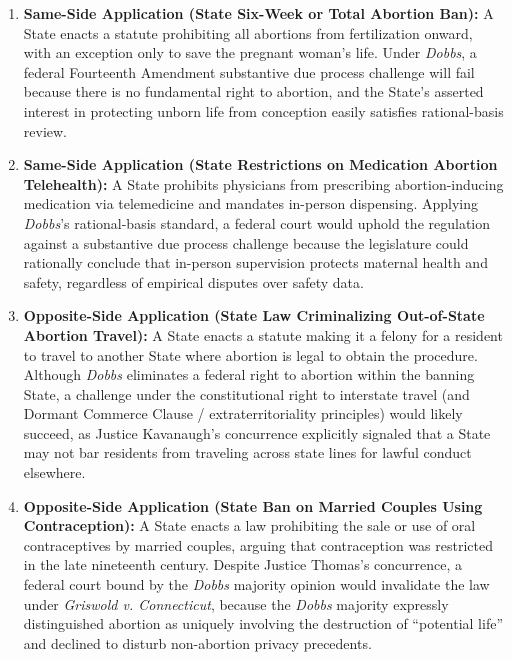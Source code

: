 \documentclass[12pt]{article}
\begin{document}
\begin{enumerate}
  \item \textbf{Same-Side Application (State Six-Week or Total Abortion Ban):} A State enacts a statute prohibiting all abortions from fertilization onward, with an exception only to save the pregnant woman's life. Under \textit{Dobbs}, a federal Fourteenth Amendment substantive due process challenge will fail because there is no fundamental right to abortion, and the State's asserted interest in protecting unborn life from conception easily satisfies rational-basis review.
  \item \textbf{Same-Side Application (State Restrictions on Medication Abortion Telehealth):} A State prohibits physicians from prescribing abortion-inducing medication via telemedicine and mandates in-person dispensing. Applying \textit{Dobbs}'s rational-basis standard, a federal court would uphold the regulation against a substantive due process challenge because the legislature could rationally conclude that in-person supervision protects maternal health and safety, regardless of empirical disputes over safety data.
  \item \textbf{Opposite-Side Application (State Law Criminalizing Out-of-State Abortion Travel):} A State enacts a statute making it a felony for a resident to travel to another State where abortion is legal to obtain the procedure. Although \textit{Dobbs} eliminates a federal right to abortion within the banning State, a challenge under the constitutional right to interstate travel (and Dormant Commerce Clause / extraterritoriality principles) would likely succeed, as Justice Kavanaugh's concurrence explicitly signaled that a State may not bar residents from traveling across state lines for lawful conduct elsewhere.
  \item \textbf{Opposite-Side Application (State Ban on Married Couples Using Contraception):} A State enacts a law prohibiting the sale or use of oral contraceptives by married couples, arguing that contraception was restricted in the late nineteenth century. Despite Justice Thomas's concurrence, a federal court bound by the \textit{Dobbs} majority opinion would invalidate the law under \textit{Griswold v. Connecticut}, because the \textit{Dobbs} majority expressly distinguished abortion as uniquely involving the destruction of ``potential life'' and declined to disturb non-abortion privacy precedents.

\end{enumerate}
\end{document}
